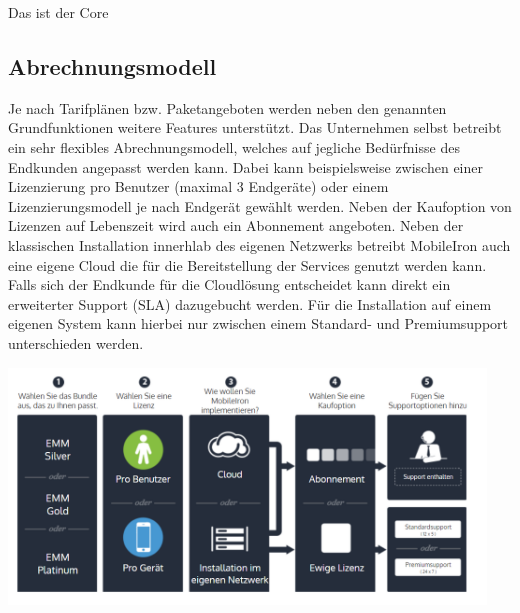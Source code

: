 Das ist der Core

\subsection {Abrechnungsmodell}

Je nach Tarifplänen bzw. Paketangeboten werden neben den genannten Grundfunktionen weitere Features unterstützt. Das Unternehmen selbst betreibt ein sehr flexibles Abrechnungsmodell, welches auf jegliche Bedürfnisse des Endkunden angepasst werden kann. Dabei kann beispielsweise zwischen einer Lizenzierung pro Benutzer (maximal 3 Endgeräte) oder einem Lizenzierungsmodell je nach Endgerät gewählt werden. Neben der Kaufoption von Lizenzen auf Lebenszeit wird auch ein Abonnement angeboten. Neben der klassischen Installation innerhlab des eigenen Netzwerks betreibt MobileIron auch eine eigene Cloud die für die Bereitstellung der Services genutzt werden kann. Falls sich der Endkunde für die Cloudlösung entscheidet kann direkt ein erweiterter Support (SLA) dazugebucht werden. Für die Installation auf einem eigenen System kann hierbei nur zwischen einem Standard- und Premiumsupport unterschieden werden.  

\includegraphics[width=0.95\textwidth]{Bilder/mi_2.png} 